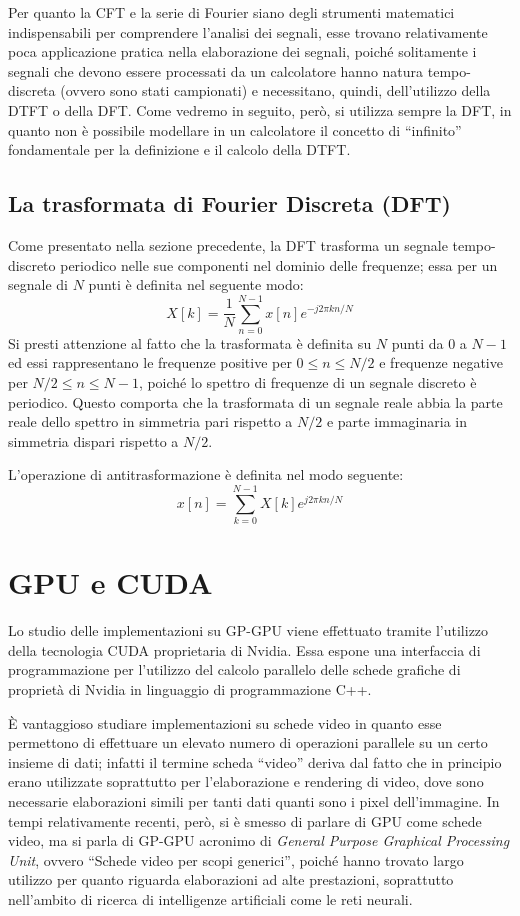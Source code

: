 Per quanto la CFT e la serie di Fourier siano degli strumenti matematici indispensabili per comprendere l'analisi dei segnali, esse trovano relativamente poca applicazione pratica nella elaborazione dei segnali, poiché solitamente i segnali che devono essere processati da un calcolatore hanno natura tempo-discreta (ovvero sono stati campionati) e necessitano, quindi, dell'utilizzo della DTFT o della DFT. Come vedremo in seguito, però, si utilizza sempre la DFT, in quanto non è possibile modellare in un calcolatore il concetto di ``infinito'' fondamentale per la definizione e il calcolo della DTFT\cite{dspguide}.

\subsection{La trasformata di Fourier Discreta (DFT)}
Come presentato nella sezione precedente, la DFT trasforma un segnale tempo-discreto periodico nelle sue componenti nel dominio delle frequenze; essa per un segnale di $N$ punti è definita nel seguente modo\cite{dspguide}:
\begin{equation}
    X[k] = \frac{1}{N}\displaystyle\sum_{n=0}^{N-1}x[n]e^{-j 2\pi kn/N}
\end{equation}
Si presti attenzione al fatto che la trasformata è definita su $N$ punti da $0$ a $N-1$ ed essi rappresentano le frequenze positive per $0 \leq n \leq N/2$ e frequenze negative per $N/2 \leq n \leq N-1$, poiché lo spettro di frequenze di un segnale discreto è periodico. Questo comporta che la trasformata di un segnale reale abbia la parte reale dello spettro in simmetria pari rispetto a $N/2$ e parte immaginaria in simmetria dispari rispetto a $N/2$.

L'operazione di antitrasformazione è definita nel modo seguente:
\begin{equation}
    x[n] = \displaystyle\sum_{k=0}^{N-1}X[k]e^{j 2\pi kn/N}
\end{equation}

\section{GPU e CUDA}
Lo studio delle implementazioni su GP-GPU viene effettuato tramite l'utilizzo della tecnologia CUDA proprietaria di Nvidia. Essa espone una interfaccia di programmazione per l'utilizzo del calcolo parallelo delle schede grafiche di proprietà di Nvidia in linguaggio di programmazione C++.

È vantaggioso studiare implementazioni su schede video in quanto esse permettono di effettuare un elevato numero di operazioni parallele su un certo insieme di dati; infatti il termine scheda ``video'' deriva dal fatto che in principio erano utilizzate soprattutto per l'elaborazione e rendering di video, dove sono necessarie elaborazioni simili per tanti dati quanti sono i pixel dell'immagine. In tempi relativamente recenti, però, si è smesso di parlare di GPU come schede video, ma si parla di GP-GPU acronimo di \textit{General Purpose Graphical Processing Unit}, ovvero ``Schede video per scopi generici'', poiché hanno trovato largo utilizzo per quanto riguarda elaborazioni ad alte prestazioni, soprattutto nell'ambito di ricerca di intelligenze artificiali come le reti neurali.

